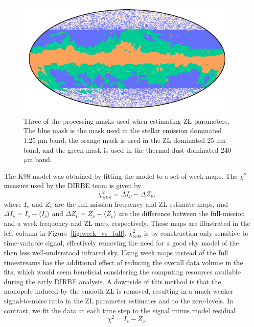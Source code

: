 \documentclass[twocolumn]{aa}
\begin{document}
\begin{figure}
    \centering
    \includegraphics[width=\columnwidth]{figs/zodi_proc_masks.pdf}
    \caption{Three of the processing masks used when estimating ZL parameters. The blue mask is the 
    mask used in the stellar emission dominated 1.25 $\mathrm{\mu m}$ band, the orange mask is used 
    in the ZL dominated 25 $\mathrm{\mu m}$ band, and the green mask is used in the thermal dust dominated 
    240 $\mathrm{\mu m}$ band.}
    \label{fig:zodi-procmask}
\end{figure}
The K98 model was obtained by fitting the model to a set of week-maps. 
The $\chi^2$ measure used by the DIRBE team is given by
\begin{equation}
    \chi^2_\mathrm{K98} = \Delta I_\nu - \Delta Z_\nu,
\end{equation}
where $I_\nu$ and $Z_\nu$ are the full-mission frequency and ZL estimate 
maps, and $\Delta I_\nu = I_\nu - \langle I_\nu \rangle$ and $\Delta Z_\nu = Z_\nu - \langle Z_\nu \rangle$ are the difference between 
the full-mission and a week frequency and ZL map, respectively. These 
maps are illustrated in the left column in Figure~\ref{fig:week_vs_full}. 
$\chi^2_\mathrm{K98}$ is by construction only sensitive to time-variable 
signal, effectively removing the need for a good sky model of the then 
less well-understood infrared sky. Using week maps instead of the full 
timestreams has the additional effect of reducing the overall data 
volume in the fits, which would seem beneficial considering the 
computing resources available during the early DIRBE analysis. A 
downside of this method is that the monopole induced by the smooth ZL is 
removed, resulting in a much weaker signal-to-noise ratio in the ZL 
parameter estimates and to the zero-levels. In contrast, we fit the data 
at each time step to the signal minus model residual
\begin{equation}\label{eq:chisq}
    \chi^2 = I_\nu - Z_\nu.
\end{equation}
\end{document}
